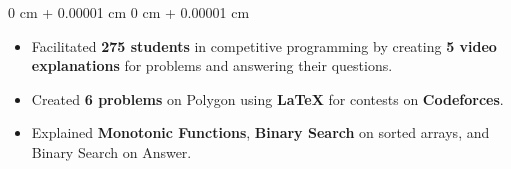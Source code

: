 \documentclass[9pt, letterpaper]{extarticle}
\newenvironment{highlights}{
    \begin{itemize}[
        topsep=0.06 cm,
        parsep=0.06 cm,
        partopsep=0pt,
        itemsep=0pt,
        leftmargin=0 cm + 10pt
    ]
}{
    \end{itemize}
} %
\newenvironment{onecolentry}{
    \begin{adjustwidth}{
        0 cm + 0.00001 cm
    }{
        0 cm + 0.00001 cm
    }
}{
    \end{adjustwidth}
} %
\begin{document}
        \begin{onecolentry}
            \begin{highlights}
                \item Facilitated \textbf{275 students} in competitive programming by creating \textbf{5 video explanations} for problems and answering their questions.
                \item Created \textbf{6 problems} on Polygon using \textbf{LaTeX} for contests on \textbf{Codeforces}.
                \item Explained \textbf{Monotonic Functions}, \textbf{Binary Search} on sorted arrays, and Binary Search on Answer.
            \end{highlights}
        \end{onecolentry}
\end{document}
